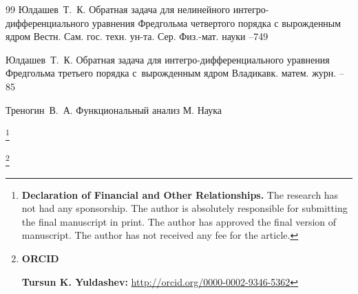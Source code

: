 \begin{thebibliography}{99}
\by Юлдашев~Т.~К.
\paper Обратная задача для нелинейного интегро- дифференциального уравнения Фредгольма четвертого порядка с вырожденным ядром
\jour Вестн. Сам. гос. техн. ун-та. Сер. Физ.-мат. науки
--749

\by Юлдашев~Т.~К.
\paper Обратная задача для интегро-дифференциального уравнения Фредгольма третьего порядка с~вырожденным ядром
\jour Владикавк. матем. журн.
--85

\by Треногин~В.~А.
\book Функциональный анализ
\publaddr М.
\publ Наука

\end{thebibliography}

\RuDate

\newpage


\makeentitle




\thanks{{\bf Declaration of Financial and Other Relationships.}
The research has not had any sponsorship.
The author is absolutely responsible for submitting the final manuscript in print.
The author has approved the final version of manuscript.
The author has not received any fee for the article.
}


\thanks{{\bf ORCID}

{\bf Tursun K. Yuldashev:} \url{http://orcid.org/0000-0002-9346-5362}
}

\newpage

\EngRef	

